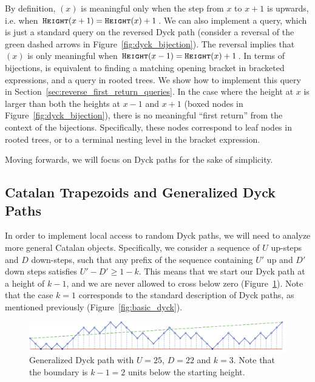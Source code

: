 By definition, $(x)$ is meaningful only when the step from $x$ to $x+1$ is upwards,
i.e. when $\texttt{\textsc{Height}}(x+1) = \texttt{\textsc{Height}}(x) + 1$.
We can also implement a  query, which is just a standard  query on the reversed Dyck path
(consider a reversal of the green dashed arrows in Figure~\ref{fig:dyck_bijection}).
The reversal implies that $(x)$ is only meaningful when $\texttt{\textsc{Height}}(x-1) = \texttt{\textsc{Height}}(x) + 1$.
In terms of bijections,  is equivalent to finding a matching opening bracket in bracketed expressions,
and a  query in rooted trees.
We show how to implement this query in Section~\ref{sec:reverse_first_return_queries}.
In the case where the height at $x$ is larger than both the heights at $x-1$ and $x+1$ (boxed nodes in Figure~\ref{fig:dyck_bijection}),
there is no meaningful ``first return'' from the context of the bijections.
Specifically, these nodes correspond to leaf nodes in rooted trees, or to a terminal nesting level in the bracket expression.

Moving forwards, we will focus on Dyck paths for the sake of simplicity.



\subsection{Catalan Trapezoids and Generalized Dyck Paths}
In order to implement local access to random Dyck paths, we will need to analyze more general Catalan objects.
Specifically, we consider a sequence of $U$ up-steps and $D$ down-steps,
such that any prefix of the sequence containing $U'$ up and $D'$ down steps satisfies $U'-D' \ge 1-k$.
This means that we start our Dyck path at a height of $k-1$, and we are never allowed to cross below zero (Figure~\ref{fig:complex_dyck}).
Note that the case $k=1$ corresponds to the standard description of Dyck paths, as mentioned previously (Figure~\ref{fig:basic_dyck}).
\begin{figure}[htbp]
    \centering
    \includegraphics[width=\textwidth]{images/complex_dyck_path.pdf}
    \caption{Generalized Dyck path with $U = 25$, $D = 22$ and $k = 3$.
             Note that the boundary is $k-1 = 2$ units below the starting height.} \label{fig:complex_dyck}
\end{figure}


